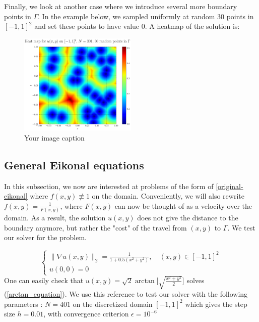 \documentclass[11pt]{article}
\theoremstyle{definition}
\theoremstyle{remark}
\begin{document}
\vspace{5pt}
\noindent Finally, we look at another case where we introduce several more boundary points in $\Gamma$. In the example below, we sampled uniformly at random 30 points in $[-1,1]^2$ and set these points to have value 0. A heatmap of the solution is:

\begin{figure}[h!]
  \centering
  \includegraphics[width=0.5\textwidth]{plots/heatmap_random30.png}
  \caption{Your image caption}
  \label{fig:heatmap30random}
\end{figure}

\newpage

\subsection{General Eikonal equations}
In this subsection, we now are interested at problems of the form of \ref{original-eikonal} where $f(x,y)\not\equiv 1$ on the domain. Conveniently, we will also rewrite $f(x,y)=\frac{1}{F(x,y)}$, where $F(x,y)$ can now be thought of as a velocity over the domain. As a result, the solution $u(x,y)$ does not give the distance to the boundary anymore, but rather the "cost" of the travel from $(x,y)$ to $\Gamma$.
We test our solver for the problem.

\begin{equation}
\label{arctan_equation}
    \begin{cases}
        \|\nabla u(x,y)\|_2=\frac{1}{1+0.5(x^2+y^2)} , \quad(x,y) \in [-1,1]^2 \\
        u(0,0)= 0
    \end{cases}
\end{equation}
One can easily check that $u(x,y)=\sqrt{2}\arctan\Big[\sqrt{\frac{x^2+y^2}{2}}\Big]$ solves (\ref{arctan_equation}). We use this reference to test our solver with the following parameters : $N=401$ on the discretized domain $[-1,1]^2$ which gives the step size $h=0.01$, with convergence criterion $\epsilon=10^{-6}$
\end{document}
